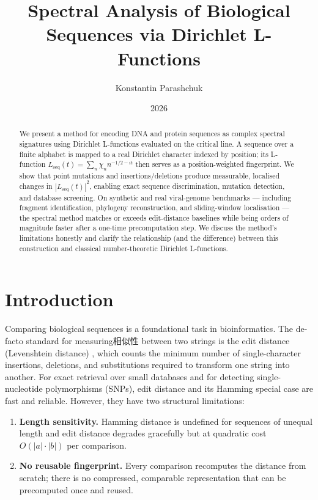 \documentclass[12pt,a4paper]{article}
\title{Spectral Analysis of Biological Sequences via Dirichlet L-Functions}
\author{Konstantin Parashchuk}
\date{2026}
\begin{document}
\maketitle

\begin{abstract}
We present a method for encoding DNA and protein sequences as complex
spectral signatures using Dirichlet L-functions evaluated on the critical
line. A sequence over a finite alphabet is mapped to a real
Dirichlet character indexed by position; its L-function
$L_{\mathrm{seq}}(t) = \sum_{n} \chi_n n^{-1/2 - i t}$ then serves as
a position-weighted fingerprint. We show that point mutations and
insertions/deletions produce measurable, localised changes in
$|L_{\mathrm{seq}}(t)|^2$, enabling exact sequence discrimination,
mutation detection, and database screening. On synthetic and real
viral-genome benchmarks --- including fragment identification,
phylogeny reconstruction, and sliding-window localisation --- the
spectral method matches or exceeds edit-distance baselines while
being orders of magnitude faster after a one-time precomputation step.
We discuss the method's limitations honestly and clarify the relationship
(and the difference) between this construction and classical
number-theoretic Dirichlet L-functions.
\end{abstract}

\section{Introduction}
\label{sec:intro}

Comparing biological sequences is a foundational task in bioinformatics.
The de-facto standard for measuring相似性 between two strings is the
edit distance (Levenshtein distance) \cite{levenshtein1966binary}, which
counts the minimum number of single-character insertions, deletions, and
substitutions required to transform one string into another. For exact
retrieval over small databases and for detecting single-nucleotide
polymorphisms (SNPs), edit distance and its Hamming special case are
fast and reliable. However, they have two structural limitations:

\begin{enumerate}[label=(\roman*)]
    \item \textbf{Length sensitivity.} Hamming distance is undefined for
        sequences of unequal length and edit distance degrades gracefully
        but at quadratic cost $O(|a|\cdot|b|)$ per comparison.
    \item \textbf{No reusable fingerprint.} Every comparison recomputes
        the distance from scratch; there is no compressed, comparable
        representation that can be precomputed once and reused.
\end{enumerate}
\end{document}
